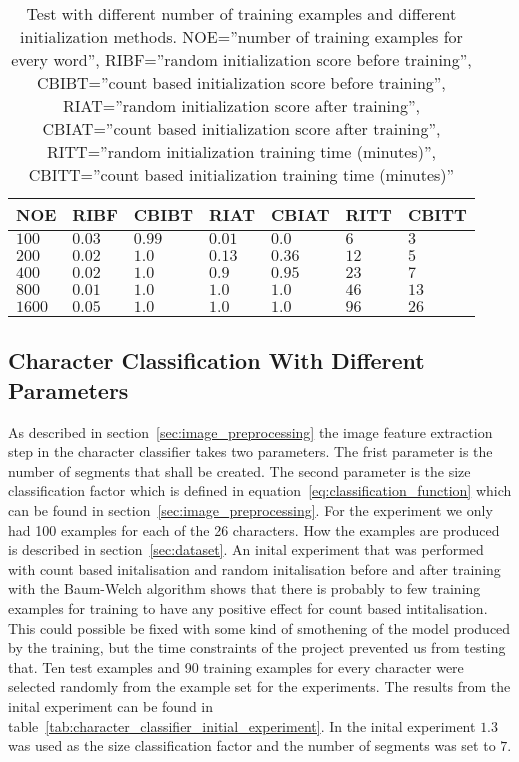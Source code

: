 \begin{table}[htb]
  \begin{center}
  \begin{tabular}{ l l l l l l l }
    NOE    & RIBF   & CBIBT  & RIAT    & CBIAT  & RITT & CBITT\\ \hline
    $100$  & $0.03$ & $0.99$ & $0.01$  & $0.0$  & $6$  & $3$\\ 
    $200$  & $0.02$ & $1.0$  & $0.13$  & $0.36$ & $12$ & $5$\\ 
    $400$  & $0.02$ & $1.0$  & $0.9$   & $0.95$ & $23$ & $7$\\
    $800$  & $0.01$ & $1.0$  & $1.0$   & $1.0$  & $46$ & $13$\\   
    $1600$ & $0.05$ & $1.0$  & $1.0$   & $1.0$  & $96$ & $26$\\  
  \end{tabular}
\end{center}
\caption{Test with different number of training examples and different initialization methods.
	 NOE=''number of training examples for every word'',
         RIBF=''random initialization score before training'',
         CBIBT=''count based initialization score before training'',
         RIAT=''random initialization score after training'',
         CBIAT=''count based initialization score after training'',
         RITT=''random initialization training time (minutes)'',
         CBITT=''count based initialization training time (minutes)''} 
\label{tab:word_classifier_results_generated_data} 
\end{table}

\subsection{Character Classification With Different Parameters}

As described in section~\ref{sec:image_preprocessing} the image feature extraction step in the character classifier takes two parameters. The frist parameter is the number of segments that shall be created. The second parameter is the size classification factor which is defined in equation~\ref{eq:classification_function} which can be found in section~\ref{sec:image_preprocessing}. For the experiment we only had 100 examples for each of the 26 characters. How the examples are produced is described in section~\ref{sec:dataset}. An inital experiment that was performed with count based initalisation and random initalisation before and after training with the Baum-Welch algorithm shows that there is probably to few training examples for training to have any positive effect for count based intitalisation. This could possible be fixed with some kind of smothening of the model produced by the training, but the time constraints of the project prevented us from testing that. Ten test examples and 90 training examples for every character were selected randomly from the example set for the experiments. The results from the inital experiment can be found in table~\ref{tab:character_classifier_initial_experiment}. In the inital experiment $1.3$ was used as the size classification factor and the number of segments was set to $7$.


